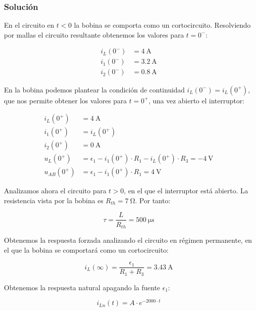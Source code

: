 \documentclass[12pt]{article}
\begin{document}
\subsubsection*{Solución}

En el circuito en $t <0$ la bobina se comporta como un cortocircuito. Resolviendo por mallas el circuito resultante obtenemos los valores para $t = 0^-$:

\begin{align*}
  i_L(0^-) &= \qty{4}{\ampere}\\
  i_1(0^-) &= \qty{3.2}{\ampere}\\
  i_2(0^-) &= \qty{0.8}{\ampere}
\end{align*}

En la bobina podemos plantear la condición de continuidad $i_L(0^-) = i_L(0^+)$, que nos permite obtener los valores para $t = 0^+$, una vez abierto el interruptor:

\begin{align*}
  i_L(0^+) &= \qty{4}{\ampere}\\
  i_1(0^+) &= i_L(0^+)\\
  i_2(0^+) &= \qty{0}{\ampere}\\
  u_L(0^+) &= \epsilon_1 - i_1(0^+) \cdot R_1 - i_L(0^+) \cdot R_3 = -\qty{4}{\volt}\\
  u_{AB}(0^+) &= \epsilon_1 - i_1(0^+) \cdot R_1 = \qty{4}{\volt}
\end{align*}

Analizamos ahora el circuito para $t > 0$, en el que el interruptor está abierto. La resistencia vista por la bobina es $R_{th} = \qty{7}{\ohm}$. Por tanto:

\begin{equation*}
  \tau = \frac{L}{R_{th}} = \qty{500}{\micro\second}
\end{equation*}

Obtenemos la respuesta forzada analizando el circuito en régimen permanente, en el que la bobina se comportará como un cortocircuito:

\begin{equation*}
  i_{L}(\infty) = \frac{\epsilon_1}{R_1 + R_3} = \qty{3.43}{\ampere}
\end{equation*}

Obtenemos la respuesta natural apagando la fuente $\epsilon_1$:

\begin{equation*}
  i_{Ln}(t) = A \cdot e^{-2000 \cdot t}
\end{equation*}
\end{document}
